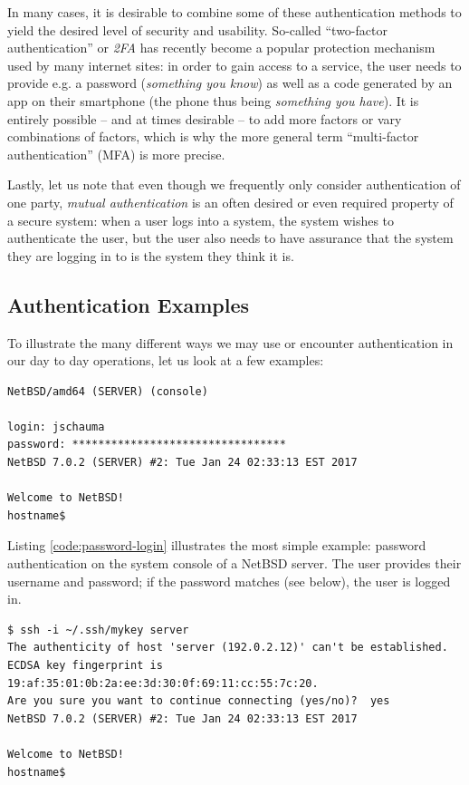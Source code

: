 In many cases, it is desirable to combine some of
these authentication methods to yield the desired
level of security and usability.  So-called
``two-factor authentication'' or {\em
2FA} has
recently become a popular protection mechanism used by
many internet sites: in order to gain access to a
service, the user needs to provide e.g. a password
({\em something you know}) as well as a code generated
by an app on their smartphone (the phone thus being
{\em something you have}).  It is entirely possible --
and at times desirable -- to add more factors or vary
combinations of factors, which is why the more general
term ``multi-factor
authentication''
(MFA) is more precise.

Lastly, let us note that even though we frequently
only consider authentication of one party, {\em mutual
authentication} is an
often desired or even required property of a secure
system:  when a user logs into a system, the system
wishes to authenticate the user, but the user also
needs to have assurance that the system they are
logging in to is the system they think it is.

\subsection{Authentication Examples}
\label{multi-user:authentication:examples}

To illustrate the many different ways we may use or
encounter authentication in our day to day operations,
let us look at a few examples:

\begin{lstlisting}[float,basicstyle=\scriptsize,label=code:password-login,caption={[Password
authentication on the console]Password authentication
on the system console on a NetBSD server.}]
NetBSD/amd64 (SERVER) (console)

login: jschauma
password: *********************************
NetBSD 7.0.2 (SERVER) #2: Tue Jan 24 02:33:13 EST 2017

Welcome to NetBSD!
hostname$
\end{lstlisting}

Listing \ref{code:password-login} illustrates the most
simple example: password authentication on the system
console of a NetBSD server.  The user provides their
username and password; if the password matches (see
below), the user is logged in.

\begin{lstlisting}[float,basicstyle=\scriptsize,label=code:ssh-login,caption={[SSH
key authentication]An example of mutual authentication
by way of SSH keys.}]
$ ssh -i ~/.ssh/mykey server
The authenticity of host 'server (192.0.2.12)' can't be established.
ECDSA key fingerprint is 19:af:35:01:0b:2a:ee:3d:30:0f:69:11:cc:55:7c:20.
Are you sure you want to continue connecting (yes/no)?  yes
NetBSD 7.0.2 (SERVER) #2: Tue Jan 24 02:33:13 EST 2017

Welcome to NetBSD!
hostname$
\end{lstlisting}

